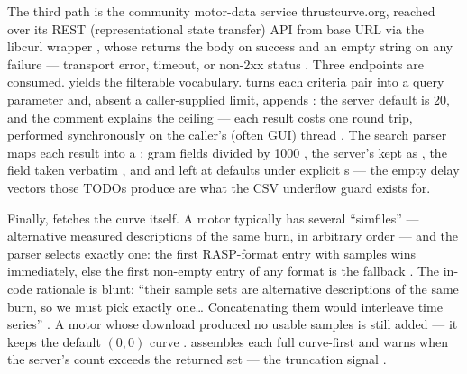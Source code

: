 The third path is the community motor-data service thrustcurve.org, reached over its
REST (representational state transfer) API from base URL
  via the
libcurl wrapper , whose  returns the body on
success and an empty string on any failure --- transport error, timeout, or non-2xx
status .
Three endpoints are consumed. 
 yields the filterable vocabulary.
  turns each criteria
pair into a query parameter and, absent a caller-supplied limit, appends
: the server default is 20, and the comment explains the ceiling ---
each result costs one  round trip, performed synchronously on the
caller's (often GUI) thread . The search parser
maps each result into a : gram fields divided by 1000
, the server's  kept as
 , the  field
taken verbatim , and  and
 left at defaults under explicit s
 --- the empty delay vectors those TODOs produce
are what the  CSV underflow guard exists for.

Finally, 
 fetches the curve itself. A motor typically has
several ``simfiles'' --- alternative measured descriptions of the same burn, in arbitrary
order --- and the parser selects exactly one: the first RASP-format entry with samples
wins immediately, else the first non-empty entry of any format is the fallback
. The in-code rationale is blunt: ``their sample
sets are alternative descriptions of the same burn, so we must pick exactly one\ldots
Concatenating them would interleave time series'' .
A motor whose download produced no usable samples is still added --- it keeps the default
$(0,0)$ curve .  assembles each
full  curve-first  and warns when
the server's  count exceeds the returned set --- the truncation signal
.


